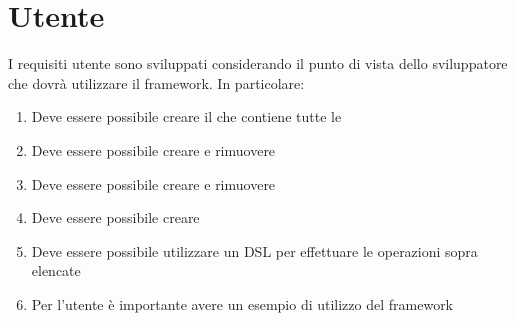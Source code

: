 \section{Utente}\label{sec:utente}
I requisiti utente sono sviluppati considerando il punto di vista dello sviluppatore che dovrà utilizzare il framework.
In particolare:
\begin{enumerate}[label=\textbf{\ref{sec:utente}.\arabic*}]
    \item \label{itm:u1} Deve essere possibile creare il \World che contiene tutte le \Entity
    \item \label{itm:u2} Deve essere possibile creare e rimuovere \Component
    \item \label{itm:u3} Deve essere possibile creare e rimuovere \Entity
    \item \label{itm:u4} Deve essere possibile creare \System
    \item \label{itm:u5} Deve essere possibile utilizzare un DSL per effettuare le operazioni sopra elencate
    \item \label{itm:u6} Per l'utente è importante avere un esempio di utilizzo del framework
\end{enumerate}

